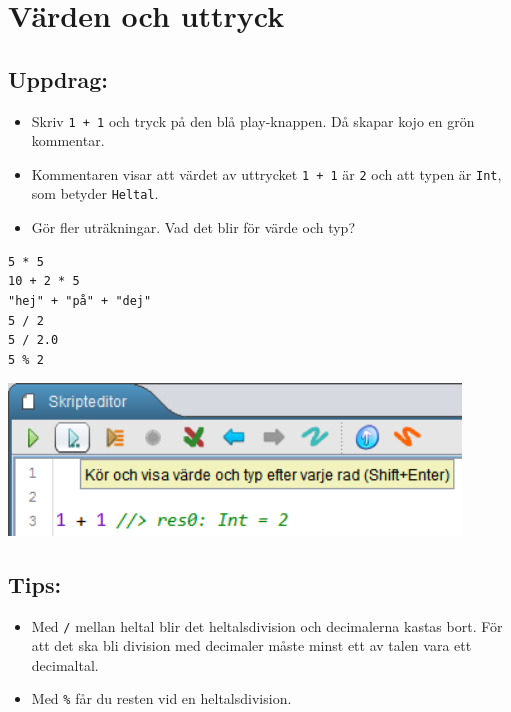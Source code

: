 \chapter{Värden och uttryck}
\begin{multicols}{2}
\section*{\color{BrickRed}Uppdrag:}


\begin{itemize}

\item {Skriv \lstinline{1 + 1} och tryck på den blå play-knappen. Då skapar kojo en grön kommentar.}
\item {Kommentaren visar att värdet av uttrycket \lstinline{1 + 1} är \lstinline{2} och att typen är \lstinline{Int}, som betyder \lstinline{Heltal}.}
\item {Gör fler uträkningar. Vad det blir för värde och typ?}

\end{itemize}



\begin{lstlisting}[numbers=none]
5 * 5
10 + 2 * 5
"hej" + "på" + "dej"
5 / 2
5 / 2.0
5 % 2
\end{lstlisting}
        


\columnbreak


\includegraphics[width=12.0cm]{../img/show-value.png}
\section*{\color{OliveGreen}Tips:}


\begin{itemize}

\item {Med \lstinline{/} mellan heltal blir det heltalsdivision och decimalerna kastas bort. För att det ska bli division med decimaler måste minst ett av talen vara ett decimaltal.}
\item {Med \lstinline{%} får du resten vid en heltalsdivision.}

\end{itemize}


\end{multicols}

